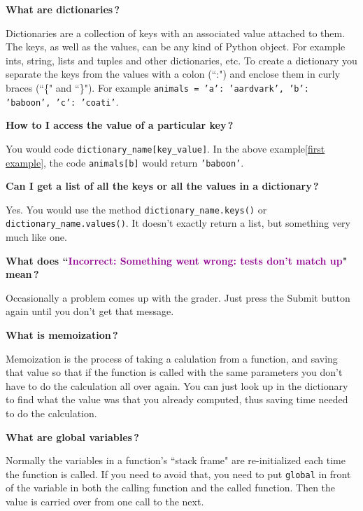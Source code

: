 \documentclass{article}
\newcommand{\inlinecode}[1]{\texttt{#1}}
\newcommand{\question}[1]{\item[$\bullet$] 
	\begin{minipage}[t]{\textwidth}
		\bfseries#1
	\end{minipage}
	\hfil
}
\newenvironment{answer}{}{}
\newenvironment{faq}{\begin{description}}{\end{description}}
\begin{document}
\begin{faq}
		\newpage
		
		\question{What are dictionaries\,?}
		\begin{answer}
			Dictionaries are a collection of keys with an associated value attached to them. The keys, as well as the values, can be any kind of Python object. For example ints, string, lists and tuples and other dictionaries, etc. To create a dictionary you separate the keys from the values with a colon (``:") and enclose them in curly braces (``\{" and ``\}"). For example \inlinecode{animals = {'a': 'aardvark', 'b': 'baboon', 'c': 'coati'}}\label{first example}.
		\end{answer}
		
		\question{How to I access the value of a particular key\,?}
		\begin{answer}
			You would code \inlinecode{dictionary_name[key_value]}. In the above example\ref{first example}, the code \inlinecode{animals[b]} would return \inlinecode{'baboon'}.
		\end{answer}
		
		\question{Can I get a list of all the keys or all the values in a dictionary\,?}
		\begin{answer}
			Yes. You would use the method \inlinecode{dictionary_name.keys()} or \inlinecode{dictionary_name.values()}. It doesn't exactly return a list, but something very much like one.
		\end{answer}
		
		\question{What does ``\textcolor[HTML]{900090}{Incorrect: Something went wrong: tests don't match up}" mean\,?}
		\begin{answer}
			Occasionally a problem comes up with the grader. Just press the Submit button again until you don't get that message.
		\end{answer}
		
		\question{What is memoization\,?}
		\begin{answer}
			Memoization is the process of taking a calulation from a function, and saving that value so that if the function is called with the same parameters you don't have to do the calculation all over again. You can just look up in the dictionary to find what the value was that you already computed, thus saving time needed to do the calculation.
		\end{answer}
		
		\question{What are global variables\,?}
		\begin{answer}
			Normally the variables in a function's ``stack frame" are re-initialized each time the function is called. If you need to avoid that, you need to put \inlinecode{global} in front of the variable in both the calling function and the called function. Then the value is carried over from one call to the next.
		\end{answer}
		

\end{faq}
\end{document}
